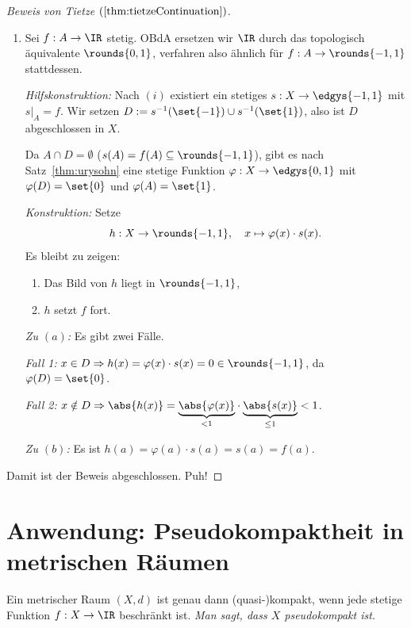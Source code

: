 \documentclass[language=ngerman]{TemplateLecture} %
\begin{document}
\begin{proof}[Beweis von Tietze $(\ref{thm:tietzeContinuation})$]
\begin{enumerate}[$(i)$]
        \item Sei $f: A \to \IR$ stetig. OBdA ersetzen wir $\IR$ durch das topologisch äquivalente $\rounds{0,1}$, verfahren also ähnlich für $f: A \to \rounds{-1,1}$ stattdessen.
        
        \emph{Hilfskonstruktion:} Nach $(i)$ existiert ein stetiges $s: X \to \edgys{-1,1}$ mit $s|_A = f$. Wir setzen $D := s^{-1}(\set{-1}) \cup s^{-1}(\set{1})$, also ist $D$ abgeschlossen in $X$.

        Da $A \cap D = \emptyset$ ($s(A) = f(A) \subseteq \rounds{-1,1}$), gibt es nach Satz~\ref{thm:urysohn} eine stetige Funktion $\varphi: X \to \edgys{0,1}$ mit $\varphi(D) = \set{0}$ und $\varphi(A) = \set{1}$.

        \emph{Konstruktion:} Setze 
        \begin{equation*}
            h: X \to \rounds{-1,1}, \quad x \mapsto \varphi(x) \cdot s(x).
        \end{equation*}
        Es bleibt zu zeigen:
        \begin{enumerate}[$(a)$]
            \item Das Bild von $h$ liegt in $\rounds{-1,1}$,
            \item $h$ setzt $f$ fort.
        \end{enumerate}

        \emph{Zu $(a)$:} Es gibt zwei Fälle.

        \emph{Fall 1:} $x \in D \Rightarrow h(x) = \varphi(x) \cdot s(x) = 0 \in \rounds{-1,1}$, da $\varphi(D) = \set{0}$.

        \emph{Fall 2:} $x \notin D \Rightarrow \abs{h(x)} = \underset{<1}{\underbrace{\abs{\varphi(x)}}} \cdot \underset{\leq 1}{\underbrace{\abs{s(x)}}} < 1$.

        \emph{Zu $(b)$:} Es ist $h(a) = \varphi(a) \cdot s(a) = s(a) = f(a)$.
    \end{enumerate}
    Damit ist der Beweis abgeschlossen. Puh!
\end{proof}

\section{Anwendung: Pseudokompaktheit in metrischen Räumen}

\begin{prop}
    Ein metrischer Raum $(X,d)$ ist genau dann (quasi-)kompakt, wenn jede stetige Funktion $f: X \to \IR$ beschränkt ist. \emph{Man sagt, dass $X$ pseudokompakt ist.}
\end{prop}
\end{document}
